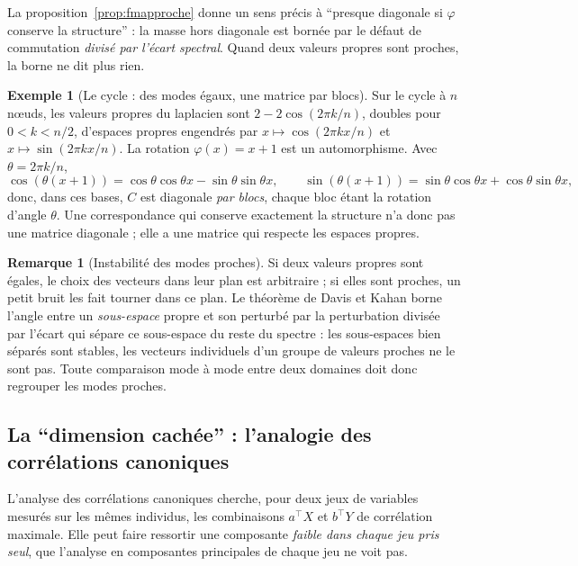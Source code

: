 \documentclass[11pt,a4paper]{article}
\theoremstyle{definition}
\newtheorem{exemple}[definition]{Exemple}
\newtheorem{remarque}[definition]{Remarque}
\theoremstyle{plain}
\begin{document}
La proposition~\ref{prop:fmapproche} donne un sens précis à \enquote{presque diagonale si $\varphi$
conserve la structure} \cite[point (1)]{complementspectral} : la masse hors diagonale est bornée
par le défaut de commutation \emph{divisé par l'écart spectral}. Quand deux valeurs propres sont
proches, la borne ne dit plus rien.

\begin{exemple}[Le cycle : des modes égaux, une matrice par blocs]
\label{ex:cycle}
Sur le cycle à $n$ nœuds, les valeurs propres du laplacien sont $2-2\cos(2\pi k/n)$, doubles pour
$0<k<n/2$, d'espaces propres engendrés par $x\mapsto\cos(2\pi kx/n)$ et $x\mapsto\sin(2\pi kx/n)$.
La rotation $\varphi(x)=x+1$ est un automorphisme. Avec $\theta=2\pi k/n$,
\[ \cos(\theta(x+1))=\cos\theta\cos\theta x-\sin\theta\sin\theta x,\qquad
   \sin(\theta(x+1))=\sin\theta\cos\theta x+\cos\theta\sin\theta x, \]
donc, dans ces bases, $C$ est diagonale \emph{par blocs}, chaque bloc étant la rotation d'angle
$\theta$. Une correspondance qui conserve exactement la structure n'a donc pas une matrice
diagonale ; elle a une matrice qui respecte les espaces propres.
\end{exemple}

\begin{remarque}[Instabilité des modes proches]
\label{rem:daviskahan}
Si deux valeurs propres sont égales, le choix des vecteurs dans leur plan est arbitraire ; si elles
sont proches, un petit bruit les fait tourner dans ce plan. Le théorème de Davis et Kahan
\cite{daviskahan1970} borne l'angle entre un \emph{sous-espace} propre et son perturbé par la
perturbation divisée par l'écart qui sépare ce sous-espace du reste du spectre : les sous-espaces
bien séparés sont stables, les vecteurs individuels d'un groupe de valeurs proches ne le sont pas.
Toute comparaison mode à mode entre deux domaines doit donc regrouper les modes proches.
\end{remarque}

\subsection{La \enquote{dimension cachée} : l'analogie des corrélations canoniques}

L'analyse des corrélations canoniques \cite{hotelling1936} cherche, pour deux jeux de variables
mesurés sur les mêmes individus, les combinaisons $a^\top X$ et $b^\top Y$ de corrélation maximale.
Elle peut faire ressortir une composante \emph{faible dans chaque jeu pris seul}, que l'analyse en
composantes principales de chaque jeu ne voit pas.
\end{document}
